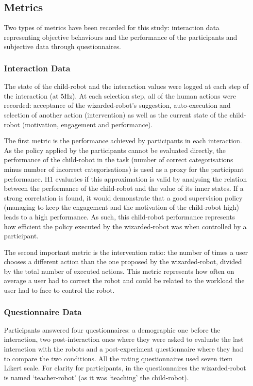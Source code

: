 \subsection{Metrics}

Two types of metrics have been recorded for this study: interaction data representing objective behaviours and the performance of the participants and subjective data through questionnaires.

\subsubsection{Interaction Data}

The state of the child-robot and the interaction values were logged at each step of the interaction (at 5Hz). At each selection step, all of the human actions were recorded: acceptance of the wizarded-robot's suggestion, auto-execution and selection of another action (intervention) as well as the current state of the child-robot (motivation, engagement and performance). 

The first metric is the performance achieved by participants in each interaction. As the policy applied by the participants cannot be evaluated directly, the performance of the child-robot in the task (number of correct categorisations minus number of incorrect categorisations) is used as a proxy for the participant performance. H1 evaluates if this approximation is valid by analysing the relation between the performance of the child-robot and the value of its inner states. If a strong correlation is found, it would demonstrate that a good supervision policy (managing to keep the engagement and the motivation of the child-robot high) leads to a high performance. As such, this child-robot performance represents how efficient the policy executed by the wizarded-robot was when controlled by a participant.

The second important metric is the intervention ratio: the number of times a user chooses a different action than the one proposed by the wizarded-robot, divided by the total number of executed actions. This metric represents how often on average a user had to correct the robot and could be related to the workload the user had to face to control the robot.

\subsubsection{Questionnaire Data}

Participants answered four questionnaires: a demographic one before the interaction, two post-interaction ones where they were asked to evaluate the last interaction with the robots and a post-experiment questionnaire where they had to compare the two conditions. All the rating questionnaires used seven item Likert scale. For clarity for participants, in the questionnaires the wizarded-robot is named `teacher-robot' (as it was `teaching' the child-robot).

